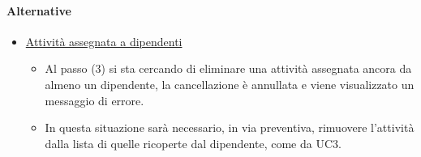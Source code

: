 \paragraph{Alternative}
\begin{itemize}
	\item \underline{Attività assegnata a dipendenti}
		\begin{itemize}
			\item Al passo (3) si sta cercando di eliminare una attività assegnata ancora da almeno un dipendente, la cancellazione è annullata e viene visualizzato un messaggio di errore.
			\item In questa situazione sarà necessario, in via preventiva, rimuovere l'attività dalla lista di quelle ricoperte dal dipendente, come da UC3.
		\end{itemize}
\end{itemize}
